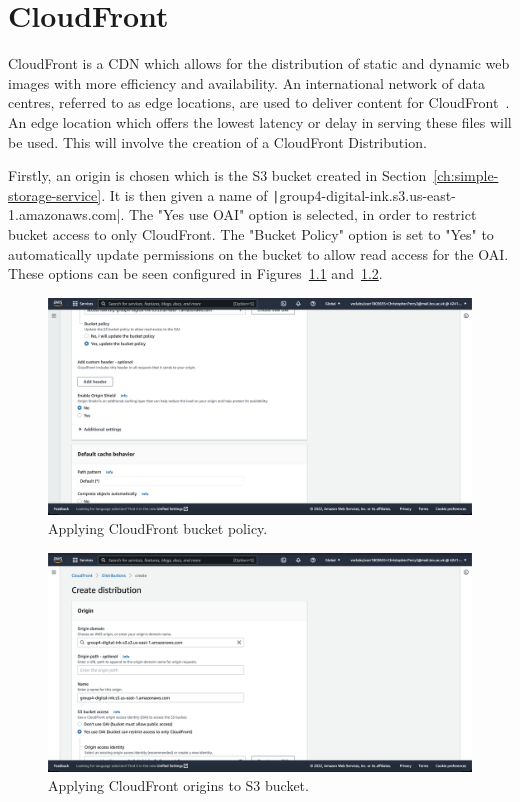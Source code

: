 \chapter{CloudFront}\label{ch:cloudfront}

CloudFront is a CDN which allows for the distribution of static and dynamic web images with more efficiency and
availability.
An international network of data centres, referred to as edge locations, are used to deliver content for
CloudFront~\parencite{amazon2022low}.
An edge location which offers the lowest latency or delay in serving these files will be used.
This will involve the creation of a CloudFront Distribution.

Firstly, an origin is chosen which is the S3 bucket created in Section~\ref{ch:simple-storage-service}.
It is then given a name of \texttt|group4-digital-ink.s3.us-east-1.amazonaws.com|.
The "Yes use OAI" option is selected, in order to restrict bucket access to only CloudFront.
The "Bucket Policy" option is set to "Yes" to automatically update permissions on the bucket to allow read access for
the OAI.
These options can be seen configured in Figures~\ref{fig:cloudfront-bucket-policy} and~\ref{fig:cloudfront-origins}.

\begin{figure}[!htbp]
    \centering
    \includegraphics[width=\textwidth]{resources/cloudfront/cloudfront-bucket-policy}
    \caption{Applying CloudFront bucket policy.}
    \label{fig:cloudfront-bucket-policy}
\end{figure}

\clearpage
\begin{figure}[!htbp]
    \centering
    \includegraphics[width=\textwidth]{resources/cloudfront/cloudfront-origin}
    \caption{Applying CloudFront origins to S3 bucket.}
    \label{fig:cloudfront-origins}
\end{figure}

